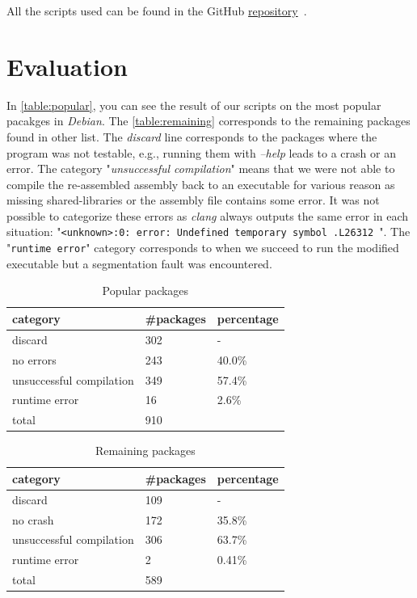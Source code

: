 \documentclass[a4paper,11pt,oneside]{report}
\begin{document}
All the scripts used can be found in the GitHub
\href{https://github.com/ha2san/debian_docker/tree/main/scripts}{repository}~\cite{repo}.

\chapter{Evaluation}

In \autoref{table:popular}, you can see the result of our scripts on the most
popular pacakges in \textit{Debian}. The \autoref{table:remaining}
corresponds to the remaining packages found in other list. The
\textit{discard} line corresponds to the packages where the program was not
testable, e.g., running them with \textit{--help} leads to a crash or an error. 
The category "\textit{unsuccessful compilation}" means that we were not able to
compile the re-assembled assembly back to an executable for various reason as
missing shared-libraries or the assembly file contains some error. It was not
possible to categorize these errors as \textit{clang} always outputs the same
error in each situation: "\texttt{<unknown>:0: error: Undefined temporary symbol .L26312 }".
The "\texttt{runtime error}" category corresponds to when we succeed to run
the modified executable but a segmentation fault was encountered.


\begin{table}[H]
    \centering
    \begin{tabular}{lll}
        \hline
        category                & \#packages & percentage\\
        \hline
        discard                  & 302 & - \\
        no errors                & 243 & 40.0\% \\
        unsuccessful compilation & 349 & 57.4\% \\
        runtime error            & 16  & 2.6\% \\
        \hline
        total                    & 910  \\ 
        \hline
    \end{tabular}
    \caption{Popular packages}
    \label{table:popular}
\end{table}


\begin{table}[H]
    \centering
    \begin{tabular}{lll}
        \hline
        category                & \#packages & percentage \\
        \hline
        discard                  & 109 & -  \\
        no crash                 & 172 & 35.8\% \\
        unsuccessful compilation & 306 & 63.7\% \\
        runtime error            & 2   & 0.41\% \\
        \hline
        total                    & 589  \\
        \hline
    \end{tabular}
    \caption{Remaining packages}
    \label{table:remaining}
\end{table}
\end{document}

